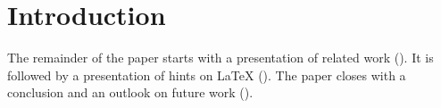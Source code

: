 
\maketitle


%
%

\begin{abstract}
\lipsum[1]

\end{abstract}

%
\IEEEpeerreviewmaketitle

\section{Introduction}
\label{sec:introduction}
\lipsum[1-3]

The remainder of the paper starts with a presentation of related work ().
It is followed by a presentation of hints on \LaTeX{} ().
The paper closes with a conclusion and an outlook on future work ().


